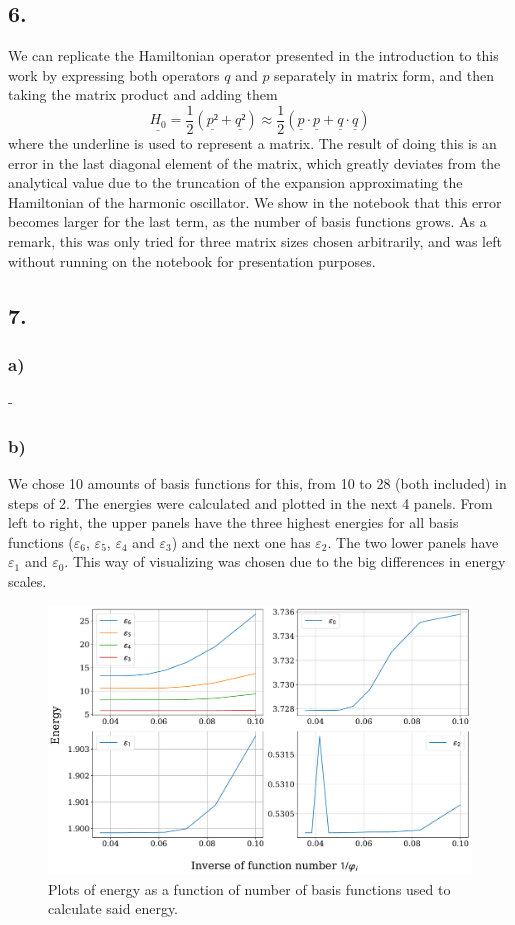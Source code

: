 \documentclass[a4paper, 12pt, notitlepage]{article}
\begin{document}
\subsection*{6.}
We can replicate the Hamiltonian operator presented in the introduction to this work by expressing both operators $q$ and $p$ separately in matrix form, and then taking the matrix product and adding them
\begin{equation}
	\underline{H_0} = \frac{1}{2}(\underline{p²} + \underline{q²}) \approx \frac{1}{2}(\underline{p}\cdot\underline{p} + \underline{q}\cdot\underline{q})
\end{equation}
where the underline is used to represent a matrix. The result of doing this is an error in the last diagonal element of the matrix, which greatly deviates from the analytical value due to the truncation of the expansion approximating the Hamiltonian of the harmonic oscillator. We show in the notebook that this error becomes larger for the last term, as the number of basis functions grows. As a remark, this was only tried for three matrix sizes chosen arbitrarily, and was left without running on the notebook for presentation purposes.

\subsection*{7.}
\subsubsection*{a)}
-
\subsubsection*{b)}
We chose 10 amounts of basis functions for this, from 10 to 28 (both included) in steps of 2. The energies were calculated and plotted in the next 4 panels. From left to right, the upper panels have the three highest energies for all basis functions ($\varepsilon_6$, $\varepsilon_5$, $\varepsilon_4$ and $\varepsilon_3$) and the next one has $\varepsilon_2$. The two lower panels have $\varepsilon_1$ and $\varepsilon_0$. This way of visualizing was chosen due to the big differences in energy scales.\\
\begin{figure}[!h]
	\centering
	\includegraphics[scale=0.5]{Figures/plot2.pdf}
	\caption{Plots of energy as a function of number of basis functions used to calculate said energy.}
\end{figure}
\end{document}
